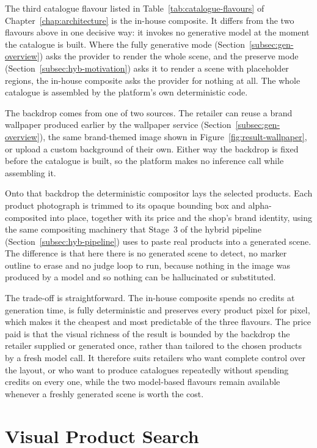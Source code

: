 The third catalogue flavour listed in Table~\ref{tab:catalogue-flavours} of Chapter~\ref{chap:architecture} is the in-house composite. It differs from the two flavours above in one decisive way: it invokes no generative model at the moment the catalogue is built. Where the fully generative mode (Section~\ref{subsec:gen-overview}) asks the provider to render the whole scene, and the preserve mode (Section~\ref{subsec:hyb-motivation}) asks it to render a scene with placeholder regions, the in-house composite asks the provider for nothing at all. The whole catalogue is assembled by the platform's own deterministic code.

The backdrop comes from one of two sources. The retailer can reuse a brand wallpaper produced earlier by the wallpaper service (Section~\ref{subsec:gen-overview}), the same brand-themed image shown in Figure~\ref{fig:result-wallpaper}, or upload a custom background of their own. Either way the backdrop is fixed before the catalogue is built, so the platform makes no inference call while assembling it.

Onto that backdrop the deterministic compositor lays the selected products. Each product photograph is trimmed to its opaque bounding box and alpha-composited into place, together with its price and the shop's brand identity, using the same compositing machinery that Stage~3 of the hybrid pipeline (Section~\ref{subsec:hyb-pipeline}) uses to paste real products into a generated scene. The difference is that here there is no generated scene to detect, no marker outline to erase and no judge loop to run, because nothing in the image was produced by a model and so nothing can be hallucinated or substituted.

The trade-off is straightforward. The in-house composite spends no credits at generation time, is fully deterministic and preserves every product pixel for pixel, which makes it the cheapest and most predictable of the three flavours. The price paid is that the visual richness of the result is bounded by the backdrop the retailer supplied or generated once, rather than tailored to the chosen products by a fresh model call. It therefore suits retailers who want complete control over the layout, or who want to produce catalogues repeatedly without spending credits on every one, while the two model-based flavours remain available whenever a freshly generated scene is worth the cost.

\section{Visual Product Search}
\label{sec:visual-search}

